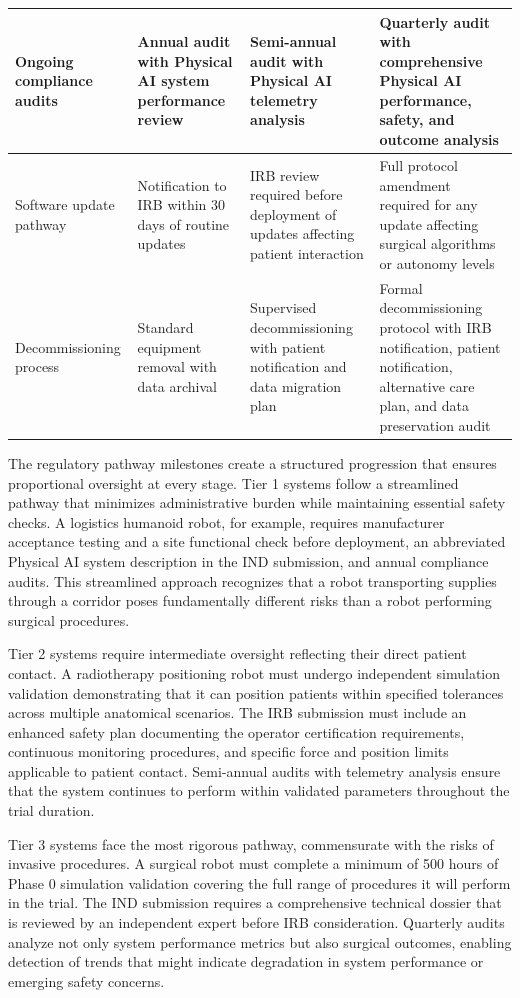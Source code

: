 \begin{table}[H]
\begin{tabularx}{\textwidth}{l X X X}
\midrule
Ongoing compliance audits & Annual audit with Physical AI system performance review & Semi-annual audit with Physical AI telemetry analysis & Quarterly audit with comprehensive Physical AI performance, safety, and outcome analysis \\
\midrule
Software update pathway & Notification to IRB within 30 days of routine updates & IRB review required before deployment of updates affecting patient interaction & Full protocol amendment required for any update affecting surgical algorithms or autonomy levels \\
\midrule
Decommissioning process & Standard equipment removal with data archival & Supervised decommissioning with patient notification and data migration plan & Formal decommissioning protocol with IRB notification, patient notification, alternative care plan, and data preservation audit \\
\bottomrule
\end{tabularx}
\end{table}

The regulatory pathway milestones create a structured progression that ensures
proportional oversight at every stage. Tier 1 systems follow a streamlined
pathway that minimizes administrative burden while maintaining essential safety
checks. A logistics humanoid robot, for example, requires manufacturer
acceptance testing and a site functional check before deployment, an
abbreviated Physical AI system description in the IND submission, and annual
compliance audits. This streamlined approach recognizes that a robot
transporting supplies through a corridor poses fundamentally different risks
than a robot performing surgical procedures.

Tier 2 systems require intermediate oversight reflecting their direct patient
contact. A radiotherapy positioning robot must undergo independent simulation
validation demonstrating that it can position patients within specified
tolerances across multiple anatomical scenarios. The IRB submission must
include an enhanced safety plan documenting the operator certification
requirements, continuous monitoring procedures, and specific force and position
limits applicable to patient contact. Semi-annual audits with telemetry
analysis ensure that the system continues to perform within validated parameters
throughout the trial duration.

Tier 3 systems face the most rigorous pathway, commensurate with the risks of
invasive procedures. A surgical robot must complete a minimum of 500 hours of
Phase 0 simulation validation covering the full range of procedures it will
perform in the trial. The IND submission requires a comprehensive technical
dossier that is reviewed by an independent expert before IRB consideration.
Quarterly audits analyze not only system performance metrics but also surgical
outcomes, enabling detection of trends that might indicate degradation in
system performance or emerging safety concerns.

